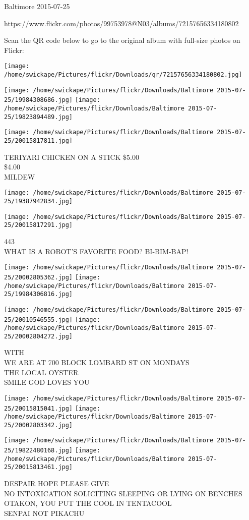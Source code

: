 \documentclass[10pt,letterpaper]{article}
\begin{document}
Baltimore 2015-07-25

https://www.flickr.com/photos/99753978@N03/albums/72157656334180802

Scan the QR code below to go to the original album with full-size photos on Flickr:

\texttt{[image: /home/swickape/Pictures/flickr/Downloads/qr/72157656334180802.jpg]}
\pagebreak

\texttt{[image: /home/swickape/Pictures/flickr/Downloads/Baltimore 2015-07-25/19984308686.jpg]}
\texttt{[image: /home/swickape/Pictures/flickr/Downloads/Baltimore 2015-07-25/19823894489.jpg]}

\texttt{[image: /home/swickape/Pictures/flickr/Downloads/Baltimore 2015-07-25/20015817811.jpg]}

TERIYARI CHICKEN ON A STICK \$5.00\\
\$4.00\\
MILDEW\\
\pagebreak

\texttt{[image: /home/swickape/Pictures/flickr/Downloads/Baltimore 2015-07-25/19387942834.jpg]}

\vspace{0.25in}
\texttt{[image: /home/swickape/Pictures/flickr/Downloads/Baltimore 2015-07-25/20015817291.jpg]}

443\\
WHAT IS A ROBOT'S FAVORITE FOOD?  BI{-}BIM{-}BAP!\\
\pagebreak

\texttt{[image: /home/swickape/Pictures/flickr/Downloads/Baltimore 2015-07-25/20002805362.jpg]}
\texttt{[image: /home/swickape/Pictures/flickr/Downloads/Baltimore 2015-07-25/19984306816.jpg]}

\texttt{[image: /home/swickape/Pictures/flickr/Downloads/Baltimore 2015-07-25/20010546555.jpg]}
\texttt{[image: /home/swickape/Pictures/flickr/Downloads/Baltimore 2015-07-25/20002804272.jpg]}

WITH\\
WE ARE AT 700 BLOCK LOMBARD ST ON MONDAYS\\
THE LOCAL OYSTER\\
SMILE GOD LOVES YOU\\
\pagebreak

\texttt{[image: /home/swickape/Pictures/flickr/Downloads/Baltimore 2015-07-25/20015815041.jpg]}
\texttt{[image: /home/swickape/Pictures/flickr/Downloads/Baltimore 2015-07-25/20002803342.jpg]}

\texttt{[image: /home/swickape/Pictures/flickr/Downloads/Baltimore 2015-07-25/19822480168.jpg]}
\texttt{[image: /home/swickape/Pictures/flickr/Downloads/Baltimore 2015-07-25/20015813461.jpg]}

DESPAIR HOPE PLEASE GIVE\\
NO INTOXICATION SOLICITING SLEEPING OR LYING ON BENCHES\\
OTAKON, YOU PUT THE COOL IN TENTACOOL\\
SENPAI NOT PIKACHU\\
\pagebreak
\end{document}
